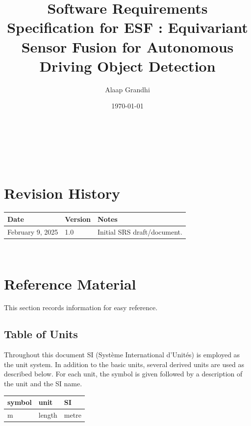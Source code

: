 \documentclass[12pt]{article}
\newcommand{\ProjectName}{ESF }
\begin{document}
\title{Software Requirements Specification for \ProjectName: Equivariant Sensor Fusion for Autonomous Driving Object Detection} 
\author{Alaap Grandhi}
\date{\today}
	
\maketitle

~\newpage


\tableofcontents

~\newpage

\section*{Revision History}

\begin{tabularx}{\textwidth}{p{3cm}p{2cm}X}
\toprule {\bf Date} & {\bf Version} & {\bf Notes}\\
\midrule
February 9, 2025 & 1.0 & Initial SRS draft/document.\\
\bottomrule
\end{tabularx}

~\newpage

\section{Reference Material}

This section records information for easy reference.

\subsection{Table of Units}

Throughout this document SI (Syst\`{e}me International d'Unit\'{e}s) is employed
as the unit system.  In addition to the basic units, several derived units are
used as described below.  For each unit, the symbol is given followed by a
description of the unit and the SI name.
~\newline

\renewcommand{\arraystretch}{1.2}
  \noindent \begin{tabular}{l l l} 
    \toprule		
    \textbf{symbol} & \textbf{unit} & \textbf{SI}\\
    \midrule 
    \si{\metre} & length & metre\\
    \bottomrule
  \end{tabular}
\end{document}
